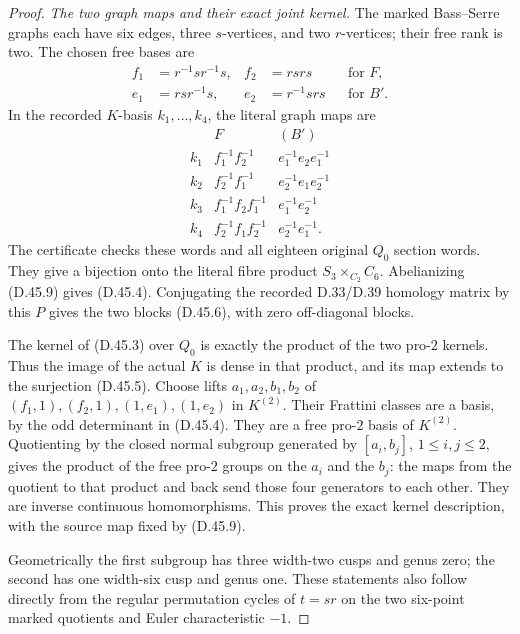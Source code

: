 \begin{proof}
\emph{The two graph maps and their exact joint kernel.}
The marked Bass--Serre graphs each
have six edges, three \(s\)-vertices,
and two \(r\)-vertices; their free
rank is two. The chosen free bases are
\[
 \begin{aligned}
 f_1&=r^{-1}s r^{-1}s,& f_2&=rsrs
                                 &&\text{for }F,\\
 e_1&=rs r^{-1}s,& e_2&=r^{-1}srs
                                 &&\text{for }B'.
 \end{aligned}                                                 \tag{D.45.8}
\]
In the recorded \(K\)-basis \(k_1,\ldots,k_4\),
the literal graph maps are
\[
 \begin{array}{c|cc}
 &F&(B')\\ \hline
 k_1&f_1^{-1}f_2^{-1}&e_1^{-1}e_2e_1^{-1}\\
 k_2&f_2^{-1}f_1^{-1}&e_2^{-1}e_1e_2^{-1}\\
 k_3&f_1^{-1}f_2f_1^{-1}&e_1^{-1}e_2^{-1}\\
 k_4&f_2^{-1}f_1f_2^{-1}&e_2^{-1}e_1^{-1}.
 \end{array}                                                   \tag{D.45.9}
\]
The certificate checks these words and
all eighteen original \(Q_0\) section
words. They give a bijection onto
the literal fibre product
\(S_3\times_{C_2}C_6\).
Abelianizing (D.45.9) gives (D.45.4).
Conjugating the recorded D.33/D.39
homology matrix by this \(P\) gives
the two blocks (D.45.6), with zero
off-diagonal blocks.

The kernel of (D.45.3) over \(Q_0\)
is exactly the product of the two
pro-\(2\) kernels. Thus the image of
the actual \(K\) is dense in that
product, and its map extends to
the surjection (D.45.5).
Choose lifts \(a_1,a_2,b_1,b_2\)
of \((f_1,1),(f_2,1),(1,e_1),(1,e_2)\)
in \(K^{(2)}\). Their Frattini classes
are a basis, by the odd determinant
in (D.45.4). They are a free pro-\(2\)
basis of \(K^{(2)}\).
Quotienting by the closed normal
subgroup generated by
\([a_i,b_j]\), \(1\le i,j\le2\),
gives the product of the free
pro-\(2\) groups on the \(a_i\)
and the \(b_j\): the maps from
the quotient to that product
and back send those four generators
to each other. They are inverse
continuous homomorphisms.
This proves the exact kernel
description, with the source
map fixed by (D.45.9).

Geometrically the first subgroup
has three width-two cusps and genus
zero; the second has one width-six
cusp and genus one. These statements
also follow directly from the
regular permutation cycles of
\(t=sr\) on the two six-point
marked quotients and Euler
characteristic \(-1\).


\end{proof}
